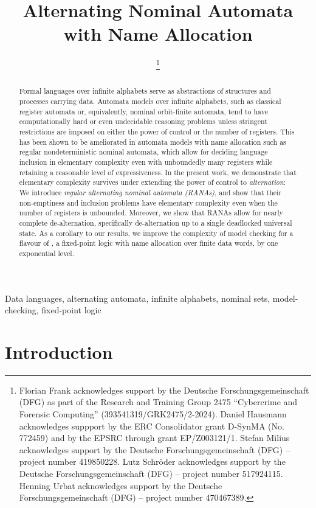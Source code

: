 \documentclass[10pt, final, conference, a4paper, twocolumn]{IEEEtran}
\title{Alternating Nominal Automata\\ with Name Allocation}
\author{
  \IEEEauthorblockN{Florian Frank\IEEEauthorrefmark{1}, Daniel Hausmann\IEEEauthorrefmark{2}, Stefan Milius\IEEEauthorrefmark{1}, Lutz Schröder\IEEEauthorrefmark{1}, Henning Urbat\IEEEauthorrefmark{1}}
  \IEEEauthorblockA{
    \IEEEauthorrefmark{1}
    \textit{Friedrich-Alexander-Universit\"at Erlangen-N\"urnberg}\\
    $\{\text{florian.ff.frank},\text{stefan.milius},\text{lutz.schroeder},\text{henning.urbat}\}$@fau.de}
  \IEEEauthorblockA{\IEEEauthorrefmark{2}\textit{University of Liverpool}\\
    d.hausmann@liverpool.ac.uk}

\thanks{Florian Frank acknowledges support by the Deutsche Forschungsgemeinschaft (DFG) as part of the Research and Training Group 2475 ``Cybercrime and Forensic Computing'' (393541319/GRK2475/2-2024). Daniel Hausmann acknowledges
  suppport by the ERC Consolidator grant D-SynMA (No. 772459) and by the EPSRC through grant EP/Z003121/1.
  Stefan Milius acknowledges support by the Deutsche Forschungsgemeinschaft (DFG) -- project number 419850228.
  Lutz Schröder  acknowledges support by the Deutsche Forschungsgemeinschaft (DFG) -- project number 517924115.
  Henning Urbat acknowledges support by the Deutsche Forschungsgemeinschaft (DFG) -- project number 470467389.}
}
\begin{document}
%
%
%
%
%

\maketitle

\begin{abstract}
  Formal languages over infinite alphabets serve as abstractions of
  structures and processes carrying data. Automata models over
  infinite alphabets, such as classical register automata or,
  equivalently, nominal orbit-finite automata, tend to have
  computationally hard or even undecidable reasoning problems unless
  stringent restrictions are imposed on either the power of control or
  the number of registers. This has been shown to be ameliorated in
  automata models with name allocation such as regular
  nondeterministic nominal automata, which allow for deciding language
  inclusion in elementary complexity even with unboundedly many
  registers while retaining a reasonable level of expressiveness. In
  the present work, we demonstrate that elementary complexity survives
  under extending the power of control to \emph{alternation}: We
  introduce \emph{regular alternating nominal automata (RANAs)}, and
  show that their non-emptiness and inclusion problems have elementary
  complexity even when the number of registers is unbounded. Moreover,
  we show that RANAs allow for nearly complete de-alternation,
  specifically de-alternation up to a single deadlocked universal
  state. As a corollary to our results, we improve the complexity of
  model checking for a flavour of \muBar, a fixed-point logic with name
  allocation over finite data words, by one exponential level.
\end{abstract}
\begin{IEEEkeywords}
Data languages, alternating automata, infinite alphabets, nominal sets,
model-checking, fixed-point logic
\end{IEEEkeywords}
\section{Introduction}\label{sec:intro}
\end{document}
